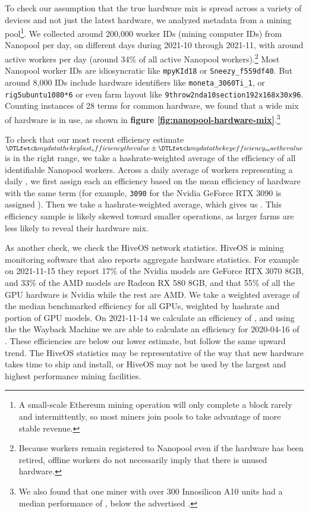 To check our assumption that the true hardware mix is spread across a variety of devices and not just the latest hardware, we analyzed metadata from a mining pool\footnote{A small-scale Ethereum mining operation will only complete a block rarely and intermittently, so most miners join pools to take advantage of more stable revenue.}. We collected around 200,000 worker IDs (mining computer IDs) from Nanopool\cite{nanopool_nanopool_2021} per day, on  different days during 2021-10 through 2021-11, with around  active workers per day (around 34\% of all active Nanopool workers).\footnote{Because workers remain registered to Nanopool even if the hardware has been retired, offline workers do not necessarily imply that there is unused hardware.} Most Nanopool worker IDs are idiosyncratic like \texttt{mpyKId18} or \texttt{Sneezy\_f559df40}. But around 8,000 IDs include hardware identifiers like \texttt{moneta\_3060Ti\_1}, or \texttt{rig5ubuntu1080*6} or even farm layout like \texttt{9throw2nda10section192x168x30x96}. Counting instances of 28 terms for common hardware, we found that a wide mix of hardware is in use, as shown in \textbf{figure \ref{fig:nanopool-hardware-mix}}.\footnote{We also found that one miner\cite{nanopool_0xa8b6_2021} with over 300 Innosilicon A10\cite{innosilicon_innosilicon_2021} units had a median performance of , below the advertised .}

To check that our most recent efficiency estimate $\var{last_efficiency}\pm\var{efficiency_mae}$ is in the right range, we take a hashrate-weighted average of the efficiency of all identifiable Nanopool workers. Across a daily average of  workers representing a daily , we first assign each an efficiency based on the mean efficiency of hardware with the same term (for example, \texttt{3090} for the Nvidia GeForce RTX 3090 is assigned ). Then we take a hashrate-weighted average, which gives us . This efficiency sample is likely skewed toward smaller operations, as larger farms are less likely to reveal their hardware mix.

As another check, we check the HiveOS\cite{hive_os_hive_2021} network statistics. HiveOS is mining monitoring software that also reports aggregate hardware statistics. For example on 2021-11-15 they report 17\% of the Nvidia models are GeForce RTX 3070 8GB, and 33\% of the AMD models are Radeon RX 580 8GB, and that 55\% of all the GPU hardware is Nvidia while the rest are AMD. We take a weighted average of the median benchmarked efficiency for all GPUs, weighted by hashrate and portion of GPU models. On 2021-11-14 we calculate an efficiency of , and using the the Wayback Machine\cite{hive_os_wayback_2020} we are able to calculate an efficiency for 2020-04-16 of . These efficiencies are below our lower estimate, but follow the same upward trend. The HiveOS statistics may be representative of the way that new hardware takes time to ship and install, or HiveOS may not be used by the largest and highest performance mining facilities.

